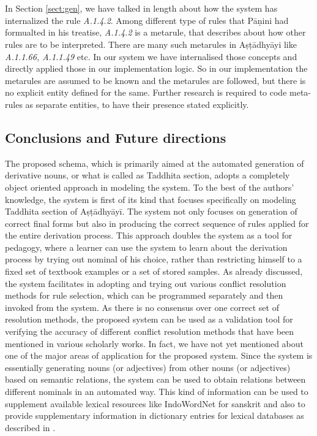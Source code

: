 \documentclass[11pt]{article}
\begin{document}
\\ \\
In Section \ref{sect:gen}, we have talked in length about how the system has internalized the rule {\sl A.1.4.2}. Among different type of rules that Pāṇini had formualted in his treatise, {\sl A.1.4.2} is a metarule, that describes about how other rules are to be interpreted. There are many such metarules in Aṣṭādhyāyi like {\sl A.1.1.66, A.1.1.49 } etc. In our system we have internalised those concepts and directly applied those in our implementation logic. So in our implementation the metarules are assumed to be known and the metarules are followed, but there is no explicit entity defined for the same. Further research is required to code meta-rules as separate entities, to have their presence stated explicitly.

\subsection{Conclusions and Future directions}
\label{subDisc}

The proposed schema, which is primarily aimed at the automated generation of derivative nouns, or what is called as Taddhita section, adopts a completely object oriented approach in modeling the system. To the best of the authors' knowledge, the system is first of its kind that focuses specifically on modeling Taddhita section of Aṣṭādhyāyī. The system not only focuses on generation of correct final forms but also in producing the correct sequence of rules applied for the entire derivation process. This approach doubles the system as a tool for pedagogy, where a learner can use the system to learn about the derivation process by trying out nominal of his choice, rather than restricting himself to a fixed set of textbook examples or a set of stored samples. As already discussed, the system facilitates in adopting and trying out various conflict resolution methods for rule selection, which can be programmed separately and then invoked from the system. As there is no consensus over one correct set of resolution methods, the proposed system can be used as a validation tool for verifying the accuracy of different conflict resolution methods that have been mentioned in various scholarly works. In fact, we have not yet mentioned about one of the major areas of application for the proposed system. Since the system is essentially generating nouns (or adjectives) from other nouns (or adjectives) based on semantic relations, the system can be used to obtain relations between different nominals in an automated way. This kind of information can be used to supplement available lexical resources like IndoWordNet for sanskrit \cite{pushpak10} and also to provide supplementary information in dictionary entries for lexical databases as described in .
\\
\end{document}

